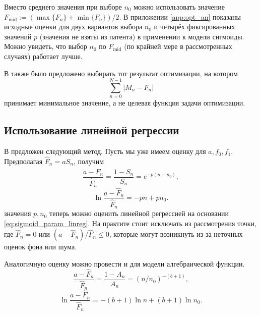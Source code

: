 Вместо среднего значения при выборе $n_0$ можно использовать значение
$F_{\text{mid}}:=(\max\{F_{n}\}+\min\{F_{n}\})/2$. В приложении
\ref{app:opt_an} показаны исходные оценки для двух вариантов выбора $n_0$ и
четырёх фиксированных значений $p$ (значения не взяты из патента) в применении
к модели сигмоиды. Можно увидеть, что выбор $n_0$ по $F_{\text{mid}}$ (по
крайней мере в рассмотренных случаях) работает лучше.

В \cite{kurnikPCRElbowDetermination2011} также было предложено выбирать тот
результат оптимизации, на котором
\[
  \sum_{n=0}^{N-1}|M_{n}-F_{n}|
\]
принимает минимальное значение, а не целевая функция задачи оптимизации.

\subsection{Использование линейной регрессии}\label{ssec:linreg_improve}

В \cite{liuProgressCurveAnalysis2011,goudarRobustParameterEstimation2009}
предложен следующий метод. Пусть мы уже имеем оценку для $a,f_0,f_1$.
Предполагая $\hat F_{n}=aS_{n}$, получим
\[
  \frac{a-\hat F_{n}}{\hat F_{n}}=\frac{1-S_{n}}{S_{n}}=e^{-p(n-n_0)},
\]
\begin{equation}\label{eq:sigmoid_param_linreg}
  \ln\frac{a-\hat F_{n}}{\hat F_{n}}=-pn + pn_0.
\end{equation}
значения $p,n_0$ теперь можно оценить линейной регрессией на основании
\eqref{eq:sigmoid_param_linreg}. На практите стоит исключать из рассмотрения
точки, где $\hat F_{n}=0$ или $(a-\hat F_{n})/\hat F_{n}\leq 0$, которые могут
возникнуть из-за неточных оценок фона или шума.

Аналогичную оценку можно провести и для модели алгебраической функции.
\[
  \frac{a-\hat F_{n}}{\hat F_{n}}=\frac{1-A_{n}}{A_{n}}=(n/n_0)^{-(b+1)},
\]
\[
  \ln\frac{a-\hat F_{n}}{\hat F_{n}}=-(b+1)\ln n+(b+1)\ln n_0.
\]

